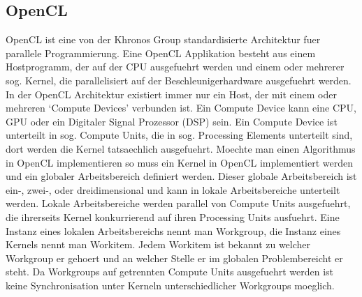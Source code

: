 \documentclass[11pt, ngerman]{article}
\begin{document}
\subsection{OpenCL}
OpenCL ist eine von der Khronos Group standardisierte Architektur fuer parallele
Programmierung.\cite{opencl_overview} Eine OpenCL Applikation besteht aus
einem Hostprogramm, der auf der CPU ausgefuehrt werden und einem oder mehrerer
sog. Kernel, die parallelisiert auf der Beschleunigerhardware ausgefuehrt werden.\cite[p.13]{oclpg_execution_model}
In der OpenCL Architektur existiert immer nur ein Host, der mit einem oder mehreren `Compute Devices' verbunden ist.
Ein Compute Device kann eine CPU, GPU oder ein Digitaler Signal Prozessor (DSP) sein.
Ein Compute Device ist unterteilt in sog. Compute Units, die in sog. Processing Elements
unterteilt sind, dort werden die Kernel tatsaechlich ausgefuehrt.\cite[p.12]{oclpg_execution_model}
Moechte man einen Algorithmus in OpenCL implementieren so muss ein Kernel in OpenCL implementiert
werden und ein globaler Arbeitsbereich definiert werden. Dieser globale Arbeitsbereich ist ein-,
zwei-, oder dreidimensional und kann in lokale Arbeitsbereiche unterteilt werden.
Lokale Arbeitsbereiche werden parallel von Compute Units
ausgefuehrt, die ihrerseits Kernel konkurrierend auf ihren Processing Units ausfuehrt.
Eine Instanz eines lokalen Arbeitsbereichs nennt man Workgroup, die Instanz eines Kernels nennt
man Workitem. Jedem Workitem ist bekannt zu welcher Workgroup er gehoert und an welcher Stelle
er im globalen Problembereicht er steht. Da Workgroups auf getrennten Compute Units ausgefuehrt
werden ist keine Synchronisation unter Kerneln unterschiedlicher Workgroups moeglich.
\end{document}
